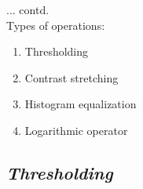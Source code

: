 \documentclass{response}
\begin{document}
{\newpage

... contd.\\

{\huge Types of operations:}

\begin{enumerate}\setlength\itemsep{-0.5em}
\item Thresholding
\item Contrast stretching
\item Histogram equalization
\item Logarithmic operator
\end{enumerate}

}


\newpage

\subsection*{\Huge\em Thresholding }
\bigskip
\end{document}
